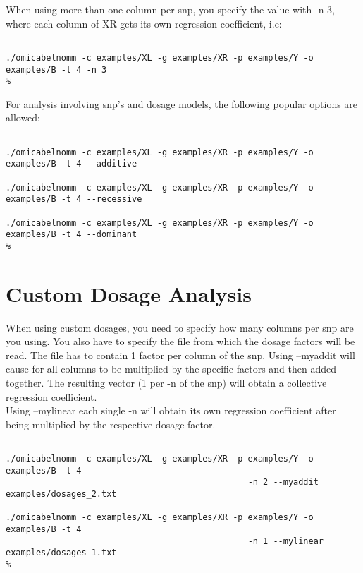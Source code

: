 \documentclass{report}
\begin{document}
When using more than one column per snp, you specify the value with -n 3, where each column of XR gets its own regression coefficient, i.e:

\begin{lstlisting}[escapechar=\%]

./omicabelnomm -c examples/XL -g examples/XR -p examples/Y -o examples/B -t 4 -n 3
%
\end{lstlisting}

For analysis involving snp's and dosage models, the following popular options are allowed:

\begin{lstlisting}[escapechar=\%]

./omicabelnomm -c examples/XL -g examples/XR -p examples/Y -o examples/B -t 4 --additive

./omicabelnomm -c examples/XL -g examples/XR -p examples/Y -o examples/B -t 4 --recessive

./omicabelnomm -c examples/XL -g examples/XR -p examples/Y -o examples/B -t 4 --dominant
%
\end{lstlisting}

\section{Custom Dosage Analysis}

When using custom dosages, you need to specify how many columns per snp are you using. You also have to specify the file from which the dosage factors will be read. The file has to contain 1 factor per column of the snp.
Using --myaddit will cause for all columns to be multiplied by the specific factors and then added together. The resulting vector (1 per -n  of the snp) will obtain a collective regression coefficient.\\
Using --mylinear each single -n will obtain its own regression coefficient after being multiplied by the respective dosage factor.

\begin{lstlisting}[escapechar=\%]

./omicabelnomm -c examples/XL -g examples/XR -p examples/Y -o examples/B -t 4
                                                -n 2 --myaddit examples/dosages_2.txt

./omicabelnomm -c examples/XL -g examples/XR -p examples/Y -o examples/B -t 4
                                                -n 1 --mylinear examples/dosages_1.txt
%
\end{lstlisting}
\end{document}
